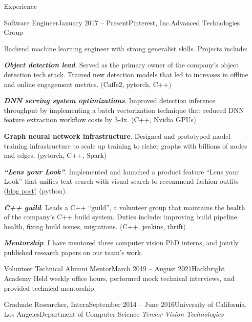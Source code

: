 \documentclass{resume}
\begin{document}
\begin{component}{Experience}
  \vspace{0.25em}
  \begin{position}{Software Engineer}{January 2017 -- Present}{Pinterest, Inc.}{Advanced Technologies Group}
    {Backend machine learning engineer with strong generalist skills.
    Projects include:

    \textbf{\emph{Object detection lead}}. Served as the primary owner of the company's object detection tech stack. Trained new detection models that led to increases in offline and online engagement metrics. (Caffe2, pytorch, C++)

    \textbf{\emph{DNN serving system optimizations}}. Improved detection inference throughput by implementing a batch vectorization technique that reduced DNN feature extraction workflow costs by 3-4x. (C++, Nvidia GPUs)

    \textbf{Graph neural network infrastructure}. Designed and prototyped model training infrastructure to scale up training to richer graphs with billions of nodes and edges. (pytorch, C++, Spark)

    \textbf{\emph{``Lens your Look''}}. Implemented and launched a product feature ``Lens your Look'' that unifies text search with visual search to recommend fashion outfits (\href{https://medium.com/@Pinterest_Engineering/building-lens-your-look-unifying-text-and-camera-search-1b2f3ef4e393}{blog post}) (python).

    \textbf{\emph{C++ guild}}. Leads a C++ ``guild'', a volunteer group that maintains the health of the company's C++ build system. Duties include: improving build pipeline health, fixing build issues, migrations. (C++, jenkins, thrift)

    \textbf{\emph{Mentorship}}. I have mentored three computer vision PhD interns, and jointly published research papers on our team's work.
    }
  \end{position}

\vspace{-1.0em}

  \begin{position}{Volunteer Technical Alumni Mentor}{March 2019 -- August 2021}{Hackbright Academy}{}
  {Held weekly office hours, performed mock technical interviews, and provided technical mentorship.}
  \end{position}

	\begin{position}{Graduate Researcher, Intern}{September 2014 -- June 2016}{University of California, Los Angeles}{Department of Computer Science}
	\emph{Tensor Vision Technologies}


\end{position}
\end{component}
\end{document}
